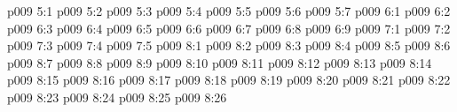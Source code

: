 \vs p009 5:1 
\vs p009 5:2 
\vs p009 5:3 
\vs p009 5:4 \pc 
\vs p009 5:5 \pc 
\vs p009 5:6 
\vs p009 5:7 
\vs p009 6:1 
\vs p009 6:2 
\vs p009 6:3 \pc 
\vs p009 6:4 \pc 
\vs p009 6:5 
\vs p009 6:6 \pc 
\vs p009 6:7 
\vs p009 6:8 \pc 
\vs p009 6:9 \pc 
{}
\vs p009 7:1 
\vs p009 7:2 
\vs p009 7:3 
\vs p009 7:4 \pc 
\vs p009 7:5 
\vs p009 8:1 
\vs p009 8:2 
\vs p009 8:3 
\vs p009 8:4 
\vs p009 8:5 
\vs p009 8:6 \pc 
\vs p009 8:7 
\vs p009 8:8 
\vs p009 8:9 \pc 
\vs p009 8:10 \pc 
\vs p009 8:11 \pc 
\vs p009 8:12 
\vs p009 8:13 
\vs p009 8:14 \pc 
\vs p009 8:15 
\vs p009 8:16 
\vs p009 8:17 
\vs p009 8:18 
\vs p009 8:19 
\vs p009 8:20 
\vs p009 8:21 
\vs p009 8:22 
\vs p009 8:23 
\vs p009 8:24 
\vs p009 8:25 
\vsetoff
\vs p009 8:26 
\quizlink
